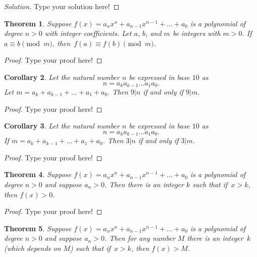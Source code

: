 \documentclass[11pt,leqno]{article}
\newtheorem{thm}{Theorem}[section]
\newtheorem{cor}[thm]{Corollary}
\theoremstyle{definition}
\begin{document}
\begin{proof}[Solution]
Type your solution here!
\end{proof}

\begin{thm}
Suppose $f(x) = a_nx^n + a_{n-1}x^{n-1} + \hdots + a_0$ is a
polynomial of degree $n>0$ with integer coefficients.  Let $a$, $b$,
and $m$ be integers with $m > 0$.  If $a \equiv b \pmod{m}$,
then~$f(a) \equiv f(b) \pmod{m}$.
\end{thm}

\begin{proof}[Proof]
Type your proof here!
\end{proof}

\begin{cor}
Let the natural number $n$ be expressed in base $10$ as
\[n = a_k a_{k-1} \hdots a_1 a_0. \]
 Let $m = a_k + a_{k-1} + \hdots + a_1 + a_0$. Then $9|n$ if and only if $9|m$.
\end{cor}

\begin{proof}[Proof]
Type your proof here!
\end{proof}


\begin{cor}
Let the natural number $n$ be expressed in base $10$ as
\[n = a_k a_{k-1} \hdots a_1 a_0. \]
If $m = a_k + a_{k-1} + \hdots + a_1 + a_0$. Then $3|n$ if and only
if $3|m$.
\end{cor}

\begin{proof}[Proof]
Type your proof here!
\end{proof}


\begin{thm}
Suppose $f(x) = a_nx^n + a_{n-1}x^{n-1} + \hdots + a_0$ is a
polynomial of degree $n > 0$ and suppose $a_n > 0$.  Then there is
an integer $k$ such that if~$x > k$, then $f(x) > 0$.
\end{thm}

\begin{proof}[Proof]
Type your proof here!
\end{proof}


\begin{thm}
Suppose $f(x) = a_nx^n + a_{n-1}x^{n-1} + \hdots + a_0$  is a
polynomial of degree $n > 0$ and suppose $a_n > 0$.  Then for any
number $M$ there is an integer~$k$ (which depends on $M$) such that
if~$x > k$, then $f(x) > M$.
\end{thm}
\end{document}

